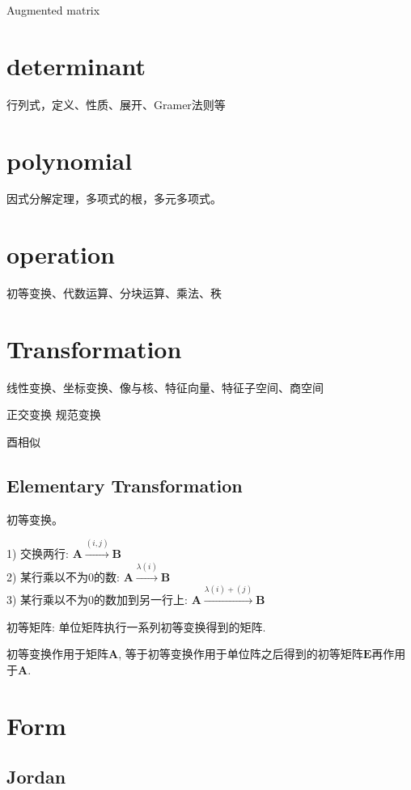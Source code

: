 \documentclass[UTF8]{../09-Mathematics}
\begin{document}
Augmented matrix

\section{determinant}
行列式，定义、性质、展开、Gramer法则等

\section{polynomial}
因式分解定理，多项式的根，多元多项式。


\section{operation}
初等变换、代数运算、分块运算、乘法、秩

\section{Transformation}

线性变换、坐标变换、像与核、特征向量、特征子空间、商空间

正交变换
规范变换

酉相似

\subsection{Elementary Transformation}
初等变换。

1) 交换两行: $ \boldsymbol A \xrightarrow {(i,j)} \boldsymbol B$ \\

2) 某行乘以不为0的数: $ \boldsymbol A \xrightarrow {\lambda(i)} \boldsymbol B$ \\

3) 某行乘以不为0的数加到另一行上: $ \boldsymbol A \xrightarrow {\lambda(i) + (j)} \boldsymbol B$

初等矩阵: 单位矩阵执行一系列初等变换得到的矩阵. 

初等变换作用于矩阵$\boldsymbol A$, 等于初等变换作用于单位阵之后得到的初等矩阵$\boldsymbol E$再作用于$\boldsymbol A$. 



\section{Form}

\subsection{Jordan}
\end{document}
